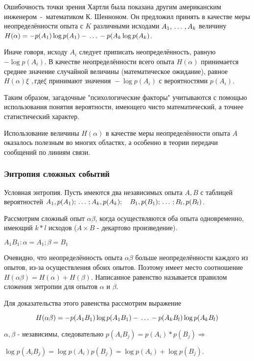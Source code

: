 ﻿\documentclass[a4paper,12pt]{report}
\begin{document}
	Ошибочность точки зрения Хартли была показана другим американским инженером~-~математиком К. Шенноном. Он предложил принять в качестве меры неопределённости опыта с $K$ различными исходами $A_1,\,\ldots\,,A_k$ величину $H(\alpha) = - p(A_1) \log p(A_1) - \,\ldots\, - p(A_k \log p(A_k)$. 
	
	Иначе говоря, исходу $A_i$ следует приписать неопределённость, равную $- \log p(A_i)$. В качестве неопределённости всего опыта $H(\alpha)$ принимается среднее значение случайной величины (математическое ожидание), равное $H(\alpha) \xi $ $,где \xi \mbox{ принимают значения } - \log p(A_i) \mbox { с вероятностями } p(A_i)$.

	Таким образом, загадочные "психологические факторы" учитываются с помощью использования понятия вероятности, имеющего чисто математический, а точнее статистический характер.
	
	Использование величины $H(\alpha)$ в качестве меры неопределённости опыта $A$ оказалось полезным во многих областях, а особенно в теории передачи сообщений по линиям связи.

\subsubsection{Энтропия сложных событий}

	Условная энтропия. Пусть имеются два независимых опыта $A, B$ с таблицей вероятностей $A_1, p(A_1); \,\ldots\, ;A_k, p(A_k); \quad B_1, p(B_1); \,\ldots\, ;B_l, p(B_l)$.
	
	Рассмотрим сложный опыт $\alpha \beta$, когда осуществляются оба опыта одновременно, имеющий $k*l$ исходов ($A \times B$ - декартово произведение).

	$A_1B_1 : \alpha = A_1; \beta = B_1$

	Очевидно, что неопределённость опыта $\alpha \beta$ больше неопределённости каждого из опытов, из-за осуществления обоих опытов. Поэтому имеет место соотношение $H(\alpha\beta) = H(\alpha)+H(\beta)$. Написанное равенство называется правилом сложения энтропии для опытов $\alpha$ и $\beta$.

	Для доказательства этого равенства рассмотрим выражение 
	
	$$
	  H(\alpha\beta) = - p(A_1B_1) \log p(A_1B_1) - \,\ldots\, - p(A_kB_l) \log p(A_kB_l)
	$$ 
	
	$\alpha, \beta$ - независимы, следовательно $p(A_iB_j) = p(A_i) * p(B_j) \Rightarrow$
	
	$\log p(A_iB_j) = \log p(A_i) p(B_j) = \log p(A_i) + \log p(B_j).
	$
\end{document}
